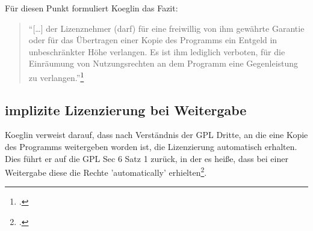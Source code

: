 \documentclass[DIV=calc,BCOR=5mm,11pt,headings=small,oneside,abstract=true, toc=bib]{scrartcl}
\begin{document}
Für diesen Punkt formuliert Koeglin das Fazit:
\begin{quote}\enquote{[\ldots] der Lizenznehmer (darf) für eine freiwillig
von ihm gewährte Garantie oder für das Übertragen einer Kopie des
Programms ein Entgeld in unbeschränkter Höhe verlangen. Es ist ihm
lediglich verboten, für die Einräumung von Nutzungsrechten an dem
Programm eine Gegenleistung zu
verlangen.}\footcite[vgl.][228]{Koglin2007a}
\end{quote}
 
\subsection{implizite Lizenzierung bei Weitergabe}
Koeglin verweist darauf, dass nach Verständnis der GPL Dritte, an die eine Kopie
des Programms weitergeben worden ist, die Lizenzierung automatisch erhalten.
Dies führt er auf die GPL Sec 6 Satz 1 zurück, in der es heiße, dass bei einer
Weitergabe diese die Rechte 'automatically'
erhielten\footcite[vgl.][186]{Koglin2007a}.

\small

\end{document}
